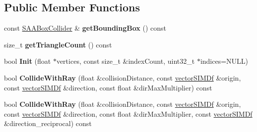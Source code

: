 \subsection*{Public Member Functions}
\begin{DoxyCompactItemize}
\item 
const \hyperlink{classirr_1_1core_1_1SAABoxCollider}{S\+A\+A\+Box\+Collider} \& {\bfseries get\+Bounding\+Box} () const \hypertarget{classirr_1_1core_1_1STriangleMeshCollider_a670b2bf982766f7a7874c7e8288adf4d}{}\label{classirr_1_1core_1_1STriangleMeshCollider_a670b2bf982766f7a7874c7e8288adf4d}

\item 
size\+\_\+t {\bfseries get\+Triangle\+Count} () const \hypertarget{classirr_1_1core_1_1STriangleMeshCollider_ab4efe19be494006cc2133c2eac8972fc}{}\label{classirr_1_1core_1_1STriangleMeshCollider_ab4efe19be494006cc2133c2eac8972fc}

\item 
bool {\bfseries Init} (float $\ast$vertices, const size\+\_\+t \&index\+Count, uint32\+\_\+t $\ast$indices=N\+U\+LL)\hypertarget{classirr_1_1core_1_1STriangleMeshCollider_a738e7d28e78bd21ea0f9e092463aa968}{}\label{classirr_1_1core_1_1STriangleMeshCollider_a738e7d28e78bd21ea0f9e092463aa968}

\item 
bool {\bfseries Collide\+With\+Ray} (float \&collision\+Distance, const \hyperlink{classirr_1_1core_1_1vectorSIMDf}{vector\+S\+I\+M\+Df} \&origin, const \hyperlink{classirr_1_1core_1_1vectorSIMDf}{vector\+S\+I\+M\+Df} \&direction, const float \&dir\+Max\+Multiplier) const \hypertarget{classirr_1_1core_1_1STriangleMeshCollider_af81f9449531da30ac786d330d75125ac}{}\label{classirr_1_1core_1_1STriangleMeshCollider_af81f9449531da30ac786d330d75125ac}

\item 
bool {\bfseries Collide\+With\+Ray} (float \&collision\+Distance, const \hyperlink{classirr_1_1core_1_1vectorSIMDf}{vector\+S\+I\+M\+Df} \&origin, const \hyperlink{classirr_1_1core_1_1vectorSIMDf}{vector\+S\+I\+M\+Df} \&direction, const float \&dir\+Max\+Multiplier, const \hyperlink{classirr_1_1core_1_1vectorSIMDf}{vector\+S\+I\+M\+Df} \&direction\+\_\+reciprocal) const \hypertarget{classirr_1_1core_1_1STriangleMeshCollider_a705cca7e00f874c7bd3892ee8cc9dedd}{}\label{classirr_1_1core_1_1STriangleMeshCollider_a705cca7e00f874c7bd3892ee8cc9dedd}

\end{DoxyCompactItemize}
